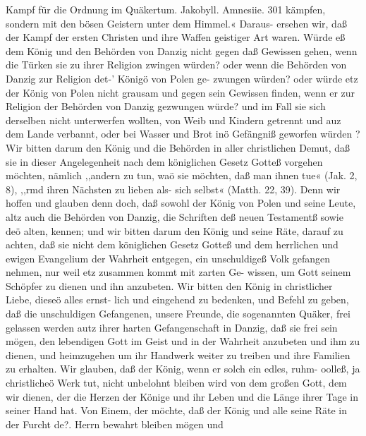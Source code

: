 Kampf für die Ordnung im Quäkertum. Jakobyll. Amnesiie. 301
kämpfen, sondern mit den bösen Geistern unter dem Himmel.«
Daraus- ersehen wir, daß der Kampf der ersten Christen und
ihre Waffen geistiger Art waren. Würde eß dem König und den
Behörden von Danzig nicht gegen daß Gewissen gehen, wenn die
Türken sie zu ihrer Religion zwingen würden? oder wenn die
Behörden von Danzig zur Religion det-’ Königö von Polen ge-
zwungen würden? oder würde etz der König von Polen nicht
grausam und gegen sein Gewissen finden, wenn er zur Religion
der Behörden von Danzig gezwungen würde? und im Fall sie
sich derselben nicht unterwerfen wollten, von Weib und Kindern
getrennt und auz dem Lande verbannt, oder bei Wasser und Brot
inö Gefängniß geworfen würden ?
Wir bitten darum den König und die Behörden in aller
christlichen Demut, daß sie in dieser Angelegenheit nach dem
königlichen Gesetz Gotteß vorgehen möchten, nämlich ,,andern zu
tun, waö sie möchten, daß man ihnen tue« (Jak. 2, 8), ,,rmd
ihren Nächsten zu lieben als- sich selbst« (Matth. 22, 39). Denn
wir hoffen und glauben denn doch, daß sowohl der König von
Polen und seine Leute, altz auch die Behörden von Danzig, die
Schriften deß neuen Testamentß sowie deö alten, kennen; und wir
bitten darum den König und seine Räte, darauf zu achten, daß
sie nicht dem königlichen Gesetz Gotteß und dem herrlichen und
ewigen Evangelium der Wahrheit entgegen, ein unschuldigeß Volk
gefangen nehmen, nur weil etz zusammen kommt mit zarten Ge-
wissen, um Gott seinem Schöpfer zu dienen und ihn anzubeten.
Wir bitten den König in christlicher Liebe, dieseö alles ernst-
lich und eingehend zu bedenken, und Befehl zu geben, daß die
unschuldigen Gefangenen, unsere Freunde, die sogenannten Quäker,
frei gelassen werden autz ihrer harten Gefangenschaft in Danzig,
daß sie frei sein mögen, den lebendigen Gott im Geist und in der
Wahrheit anzubeten und ihm zu dienen, und heimzugehen um
ihr Handwerk weiter zu treiben und ihre Familien zu erhalten.
Wir glauben, daß der König, wenn er solch ein edles, ruhm-
oolleß, ja christlicheö Werk tut, nicht unbelohnt bleiben wird
von dem großen Gott, dem wir dienen, der die Herzen der
Könige und ihr Leben und die Länge ihrer Tage in seiner
Hand hat.
Von Einem, der möchte, daß der König und alle seine
Räte in der Furcht de?. Herrn bewahrt bleiben mögen und


